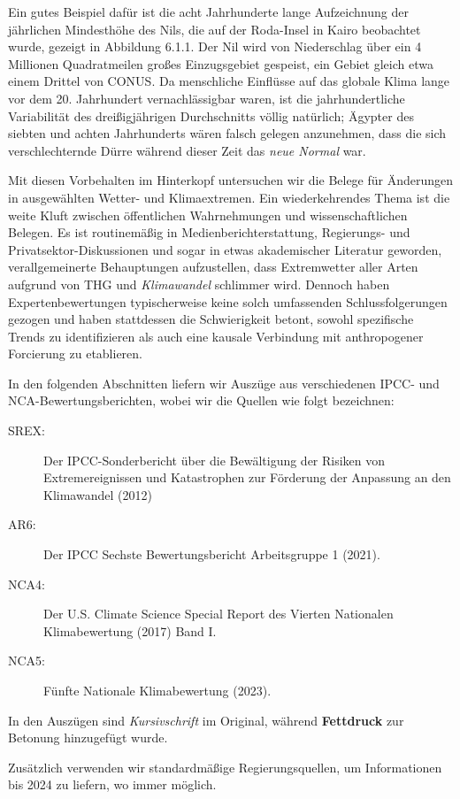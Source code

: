 \documentclass[12pt,paper=a4,DIV=12,parskip=never,chapterprefix=false,headings=standardclasses]{scrreprt}
\begin{document}
Ein gutes Beispiel dafür ist die acht Jahrhunderte lange Aufzeichnung der jährlichen Mindesthöhe des Nils, die auf der Roda-Insel in Kairo beobachtet wurde, gezeigt in Abbildung 6.1.1. Der Nil wird von Niederschlag über ein 4 Millionen Quadratmeilen großes Einzugsgebiet gespeist, ein Gebiet gleich etwa einem Drittel von CONUS. Da menschliche Einflüsse auf das globale Klima lange vor dem 20. Jahrhundert vernachlässigbar waren, ist die jahrhundertliche Variabilität des dreißigjährigen Durchschnitts völlig natürlich; Ägypter des siebten und achten Jahrhunderts wären falsch gelegen anzunehmen, dass die sich verschlechternde Dürre während dieser Zeit das \emph{neue Normal} war.

Mit diesen Vorbehalten im Hinterkopf untersuchen wir die Belege für Änderungen in ausgewählten Wetter- und Klimaextremen. Ein wiederkehrendes Thema ist die weite Kluft zwischen öffentlichen Wahrnehmungen und wissenschaftlichen Belegen. Es ist routinemäßig in Medienberichterstattung, Regierungs- und Privatsektor-Diskussionen und sogar in etwas akademischer Literatur geworden, verallgemeinerte Behauptungen aufzustellen, dass Extremwetter aller Arten aufgrund von THG und \emph{Klimawandel} schlimmer wird. Dennoch haben Expertenbewertungen typischerweise keine solch umfassenden Schlussfolgerungen gezogen und haben stattdessen die Schwierigkeit betont, sowohl spezifische Trends zu identifizieren als auch eine kausale Verbindung mit anthropogener Forcierung zu etablieren.

In den folgenden Abschnitten liefern wir Auszüge aus verschiedenen IPCC- und NCA-Bewertungsberichten, wobei wir die Quellen wie folgt bezeichnen:
\begin{description}
\item[SREX:] Der IPCC-Sonderbericht über die Bewältigung der Risiken von Extremereignissen und Katastrophen zur Förderung der Anpassung an den Klimawandel (2012)
\item[AR6:] Der IPCC Sechste Bewertungsbericht Arbeitsgruppe 1 (2021). 
\item[NCA4:] Der U.S. Climate Science Special Report des Vierten Nationalen Klimabewertung (2017) Band I.
\item[NCA5:] Fünfte Nationale Klimabewertung (2023).
\end{description}

In den Auszügen sind \emph{Kursivschrift} im Original, während \textbf{Fettdruck} zur Betonung hinzugefügt wurde.

Zusätzlich verwenden wir standardmäßige Regierungsquellen, um Informationen bis 2024 zu liefern, wo immer möglich.
\end{document}
